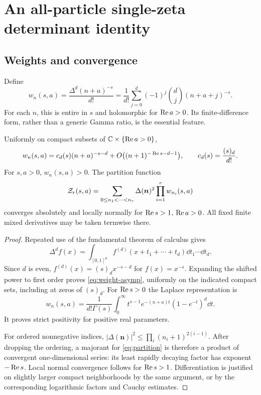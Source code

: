 \section{An all-particle single-zeta determinant identity}
\label{sec:spectral}

\subsection{Weights and convergence}
Define
\begin{equation}\label{eq:weight}
 w_n(s,a)=\frac{\Delta^d(n+a)^{-s}}{d!}
 =\frac1{d!}\sum_{j=0}^{d}(-1)^j\binom dj(n+a+j)^{-s}.
\end{equation}
For each $n$, this is entire in $s$ and holomorphic for $\operatorname{Re} a>0$.
Its finite-difference form, rather than a generic Gamma ratio, is the
essential feature.

\begin{lemma}\label{lem:decay}
Uniformly on compact subsets of $\mathbb C\times\{\operatorname{Re} a>0\}$,
\begin{equation}\label{eq:weight-asymp}
 w_n(s,a)=c_d(s)(n+a)^{-s-d}
          +O\bigl((n+1)^{-\operatorname{Re} s-d-1}\bigr),
 \qquad c_d(s)=\frac{(s)_d}{d!}.
\end{equation}
For $s,a>0$, $w_n(s,a)>0$. The partition function
\begin{equation}\label{eq:partition}
 \mathcal Z_r(s,a)=\sum_{0\le n_1<\cdots<n_r}
       \Delta(\bm n)^2\prod_{i=1}^r w_{n_i}(s,a)
\end{equation}
converges absolutely and locally normally for $\operatorname{Re} s>1$, $\operatorname{Re} a>0$.
All fixed finite mixed derivatives may be taken termwise there.
\end{lemma}
\begin{proof}
Repeated use of the fundamental theorem of calculus gives
\[
 \Delta^d f(x)=\int_{[0,1]^d}f^{(d)}(x+t_1+\cdots+t_d)
       \dd t_1\cdots\dd t_d.
\]
Since $d$ is even, $f^{(d)}(x)=(s)_d x^{-s-d}$ for $f(x)=x^{-s}$.
Expanding the shifted power to first order proves
\eqref{eq:weight-asymp}, uniformly on the indicated compact sets, including
at zeros of $(s)_d$.
For $\operatorname{Re} s>0$ the Laplace representation is
\begin{equation}\label{eq:laplace}
 w_n(s,a)=\frac1{d!\Gamma(s)}
 \int_0^\infty t^{s-1}e^{-(n+a)t}(1-e^{-t})^d\dd t.
\end{equation}
It proves strict positivity for positive real parameters.

For ordered nonnegative indices,
$|\Delta(\bm n)|^2\le\prod_i(n_i+1)^{2(i-1)}$.
After dropping the ordering, a majorant for \eqref{eq:partition} is
therefore a product of convergent one-dimensional series: its least
rapidly decaying factor has exponent $-\operatorname{Re} s$.
Local normal convergence follows for $\operatorname{Re} s>1$. Differentiation is
justified on slightly larger compact neighborhoods by the same argument,
or by the corresponding logarithmic factors and Cauchy estimates.
\end{proof}

